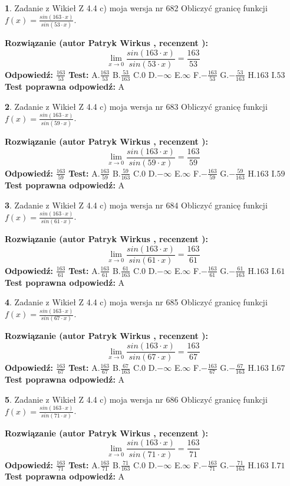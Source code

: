 \documentclass[12pt, a4paper]{article}
\theoremstyle{definition} %
\newtheorem{zad}{}
\newcommand{\zadStart}[1]{\begin{zad}#1\newline}
\newcommand{\zadStop}{\end{zad}}
\newcommand{\rozwStart}[2]{\noindent \textbf{Rozwiązanie (autor #1 , recenzent #2): }\newline}
\newcommand{\rozwStop}{\newline}
\newcommand{\odpStart}{\noindent \textbf{Odpowiedź:}\newline}
\newcommand{\odpStop}{\newline}
\newcommand{\testStart}{\noindent \textbf{Test:}\newline}
\newcommand{\testStop}{\newline}
\newcommand{\kluczStart}{\noindent \textbf{Test poprawna odpowiedź:}\newline}
\newcommand{\kluczStop}{\newline}
\begin{document}
\zadStart{Zadanie z Wikieł Z 4.4 c) moja wersja nr 682}
Obliczyć granicę funkcji $f(x)=\frac{sin(163\cdot x)}{sin(53\cdot x)}$.
\zadStop
\rozwStart{Patryk Wirkus}{}
$$\lim\limits_{x\to 0}\frac{sin(163\cdot x)}{sin(53\cdot x)}=
\frac{163}{53}$$
\rozwStop
\odpStart
$\frac{163}{53}$
\odpStop
\testStart
A.$\frac{163}{53}$
B.$\frac{53}{163}$
C.$0$
D.$-\infty$
E.$\infty$
F.$-\frac{163}{53}$
G.$-\frac{53}{163}$
H.$163$
I.$53$
\testStop
\kluczStart
A
\kluczStop



\zadStart{Zadanie z Wikieł Z 4.4 c) moja wersja nr 683}
Obliczyć granicę funkcji $f(x)=\frac{sin(163\cdot x)}{sin(59\cdot x)}$.
\zadStop
\rozwStart{Patryk Wirkus}{}
$$\lim\limits_{x\to 0}\frac{sin(163\cdot x)}{sin(59\cdot x)}=
\frac{163}{59}$$
\rozwStop
\odpStart
$\frac{163}{59}$
\odpStop
\testStart
A.$\frac{163}{59}$
B.$\frac{59}{163}$
C.$0$
D.$-\infty$
E.$\infty$
F.$-\frac{163}{59}$
G.$-\frac{59}{163}$
H.$163$
I.$59$
\testStop
\kluczStart
A
\kluczStop



\zadStart{Zadanie z Wikieł Z 4.4 c) moja wersja nr 684}
Obliczyć granicę funkcji $f(x)=\frac{sin(163\cdot x)}{sin(61\cdot x)}$.
\zadStop
\rozwStart{Patryk Wirkus}{}
$$\lim\limits_{x\to 0}\frac{sin(163\cdot x)}{sin(61\cdot x)}=
\frac{163}{61}$$
\rozwStop
\odpStart
$\frac{163}{61}$
\odpStop
\testStart
A.$\frac{163}{61}$
B.$\frac{61}{163}$
C.$0$
D.$-\infty$
E.$\infty$
F.$-\frac{163}{61}$
G.$-\frac{61}{163}$
H.$163$
I.$61$
\testStop
\kluczStart
A
\kluczStop



\zadStart{Zadanie z Wikieł Z 4.4 c) moja wersja nr 685}
Obliczyć granicę funkcji $f(x)=\frac{sin(163\cdot x)}{sin(67\cdot x)}$.
\zadStop
\rozwStart{Patryk Wirkus}{}
$$\lim\limits_{x\to 0}\frac{sin(163\cdot x)}{sin(67\cdot x)}=
\frac{163}{67}$$
\rozwStop
\odpStart
$\frac{163}{67}$
\odpStop
\testStart
A.$\frac{163}{67}$
B.$\frac{67}{163}$
C.$0$
D.$-\infty$
E.$\infty$
F.$-\frac{163}{67}$
G.$-\frac{67}{163}$
H.$163$
I.$67$
\testStop
\kluczStart
A
\kluczStop



\zadStart{Zadanie z Wikieł Z 4.4 c) moja wersja nr 686}
Obliczyć granicę funkcji $f(x)=\frac{sin(163\cdot x)}{sin(71\cdot x)}$.
\zadStop
\rozwStart{Patryk Wirkus}{}
$$\lim\limits_{x\to 0}\frac{sin(163\cdot x)}{sin(71\cdot x)}=
\frac{163}{71}$$
\rozwStop
\odpStart
$\frac{163}{71}$
\odpStop
\testStart
A.$\frac{163}{71}$
B.$\frac{71}{163}$
C.$0$
D.$-\infty$
E.$\infty$
F.$-\frac{163}{71}$
G.$-\frac{71}{163}$
H.$163$
I.$71$
\testStop
\kluczStart
A
\kluczStop
\end{document}
